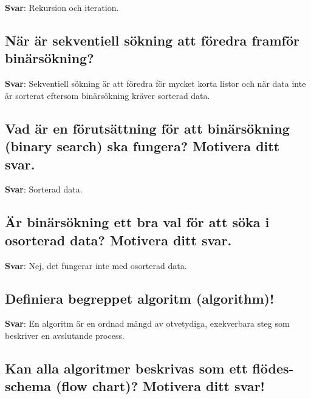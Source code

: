 \documentclass[a4paper,11pt,oneside]{article}
\begin{document}
\begin{sloppypar}
\label{q:182:sa:sv:True}

\textbf{Svar}: Rekursion och iteration.



\subsection{N\"ar \"ar sekventiell s\"okning att f\"oredra framf\"or bin\"ars\"okning?}

\label{q:183:sa:sv:True}

\textbf{Svar}: Sekventiell s\"okning \"ar att f\"oredra f\"or mycket korta listor och n\"ar data inte \"ar sorterat eftersom bin\"ars\"okning kr\"aver sorterad data.



\subsection{Vad \"ar en f\"oruts\"attning f\"or att bin\"ars\"okning (binary search) ska fungera? Motivera ditt svar.}

\label{q:184:sa:sv:True}

\textbf{Svar}: Sorterad data.



\subsection{\"Ar bin\"ars\"okning ett bra val f\"or att s\"oka i osorterad data? Motivera ditt svar.}

\label{q:185:sa:sv:True}

\textbf{Svar}: Nej, det fungerar inte med osorterad data.



\subsection{Definiera begreppet algoritm (algorithm)!}

\label{q:186:sa:sv:True}

\textbf{Svar}: En algoritm \"ar en ordnad m\"angd av otvetydiga, exekverbara steg som beskriver en avslutande process.



\subsection{Kan alla algoritmer beskrivas som ett fl\"odes-schema (flow chart)? Motivera ditt svar!}


\end{sloppypar}
\end{document}
